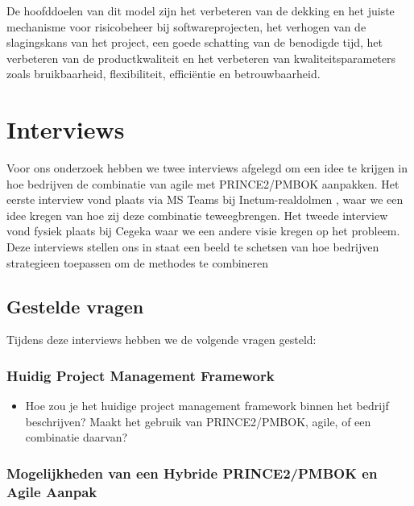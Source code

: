 \documentclass[dutch]{hogent-article}
\begin{document}
 De hoofddoelen van dit model zijn het verbeteren van de dekking en het juiste mechanisme voor risicobeheer bij softwareprojecten, het verhogen van de slagingskans van het project, een goede \linebreak schatting  van de benodigde tijd, het verbeteren van de productkwaliteit en het verbeteren van \linebreak kwaliteitsparameters zoals bruikbaarheid, flexibiliteit, efficiëntie en betrouwbaarheid.

\section{Interviews}
\label{sec:interviews}
Voor ons onderzoek hebben we twee interviews afgelegd om een idee te krijgen
in hoe bedrijven de combinatie van agile met PRINCE2/PMBOK aanpakken.
Het eerste interview vond plaats via MS Teams bij Inetum-realdolmen
, waar we een idee kregen van hoe zij deze combinatie teweegbrengen. Het tweede interview vond fysiek plaats
bij Cegeka waar we een andere visie kregen op het probleem. Deze interviews stellen ons in staat een beeld te schetsen van hoe bedrijven strategieen toepassen om de methodes te combineren

\subsection{Gestelde vragen}%
\label{ssec:gestelde-vragen}

Tijdens deze interviews hebben we de volgende vragen gesteld:

\subsubsection{Huidig Project Management Framework}
\label{ssec:Huidig Project Management Framework}

\begin{itemize}
    \item Hoe zou je het huidige project management framework binnen het bedrijf beschrijven? Maakt het gebruik van PRINCE2/PMBOK, agile, of een combinatie daarvan?
\end{itemize}

\subsubsection{Mogelijkheden van een Hybride PRINCE2/PMBOK en Agile Aanpak}
\label{ssec:Mogelijkheden en uitdagingen van een Hybride PRINCE2/PMBOK en Agile Aanpak}
\end{document}
